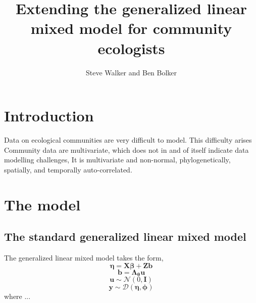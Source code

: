 \documentclass{article}
\title{Extending the generalized linear mixed model for community ecologists}
\author{Steve Walker and Ben Bolker}
\date{}
\newcommand{\mat}{\bm}
\newcommand{\trans}{^\top}
\newcommand{\dnorm}{\mathcal{N}}
\newcommand{\dexpfam}{\mathcal{D}}
\begin{document}
\maketitle

\section{Introduction}

Data on ecological communities are very difficult to model.  This
difficulty arises 
Community data are multivariate, which does not in and of itself
indicate data modelling challenges, It is multivariate and non-normal,
phylogenetically, spatially, and temporally auto-correlated.



\section{The model}

\subsection{The standard generalized linear mixed model}

The generalized linear mixed model takes the form,
\begin{equation}
  \label{eq:6}
  \bm\eta = \bm X\bm\beta + \bm Z\bm b
\end{equation}
\begin{equation}
  \label{eq:10}
  \bm b = \bm\Lambda_{\bm\theta}\bm u
\end{equation}
\begin{equation}
  \label{eq:7}
  \bm u \sim \dnorm(0, \bm I)
\end{equation}
\begin{equation}
  \label{eq:8}
  \bm y \sim \dexpfam (\bm\eta, \bm\phi)
\end{equation}
where ...  
\end{document}
